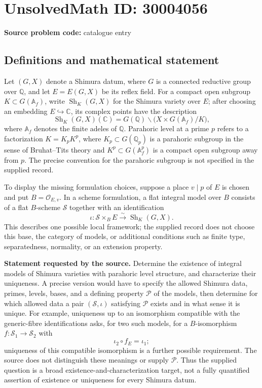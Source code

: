 \documentclass[11pt]{article}
\newcommand{\Q}{\mathbb{Q}}
\newcommand{\C}{\mathbb{C}}
\newcommand{\A}{\mathbb{A}}
\begin{document}
\section*{UnsolvedMath ID: 30004056}
\textbf{Source problem code:} catalogue entry
\subsection{Definitions and mathematical statement}
Let \((G,X)\) denote a Shimura datum, where \(G\) is a connected reductive group over \(\Q\), and let \(E=E(G,X)\) be its reflex field. For a compact open subgroup \(K\subset G(\A_f)\), write \(\operatorname{Sh}_K(G,X)\) for the Shimura variety over \(E\); after choosing an embedding \(E\hookrightarrow\C\), its complex points have the description
\[
\operatorname{Sh}_K(G,X)(\C)
=G(\Q)\backslash\bigl(X\times G(\A_f)/K\bigr),
\]
where \(\A_f\) denotes the finite adeles of \(\Q\). Parahoric level at a prime \(p\) refers to a factorization \(K=K_pK^p\), where \(K_p\subset G(\Q_p)\) is a parahoric subgroup in the sense of Bruhat--Tits theory and \(K^p\subset G(\A_f^p)\) is a compact open subgroup away from \(p\). The precise convention for the parahoric subgroup is not specified in the supplied record.

To display the missing formulation choices, suppose a place \(v\mid p\) of \(E\) is chosen and put \(B=\mathcal O_{E,v}\). In a scheme formulation, a flat integral model over \(B\) consists of a flat \(B\)-scheme \(\mathscr S\) together with an identification
\[
\iota:\mathscr S\times_B E\xrightarrow{\sim}\operatorname{Sh}_K(G,X).
\]
This describes one possible local framework; the supplied record does not choose this base, the category of models, or additional conditions such as finite type, separatedness, normality, or an extension property.

\textbf{Statement requested by the source.} Determine the existence of integral models of Shimura varieties with parahoric level structure, and characterize their uniqueness. A precise version would have to specify the allowed Shimura data, primes, levels, bases, and a defining property \(\mathcal P\) of the models, then determine for which allowed data a pair \((\mathscr S,\iota)\) satisfying \(\mathcal P\) exists and in what sense it is unique. For example, uniqueness up to an isomorphism compatible with the generic-fibre identifications asks, for two such models, for a \(B\)-isomorphism \(f:\mathscr S_1\to\mathscr S_2\) with
\[
\iota_2\circ f_E=\iota_1;
\]
uniqueness of this compatible isomorphism is a further possible requirement. The source does not distinguish these meanings or supply \(\mathcal P\). Thus the supplied question is a broad existence-and-characterization target, not a fully quantified assertion of existence or uniqueness for every Shimura datum.
\end{document}
